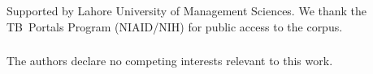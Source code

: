 \documentclass[runningheads]{llncs}
\begin{document}
\begin{credits}
\subsubsection{\ackname} Supported by Lahore University of Management Sciences. We thank the TB~Portals Program (NIAID/NIH) for public access to the corpus.
\subsubsection{\discintname} The authors declare no competing interests relevant to this work.
\end{credits}



\end{document}
